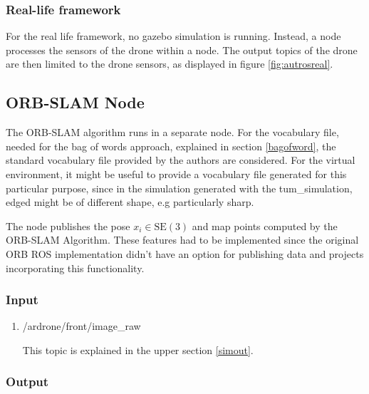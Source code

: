 	\subsubsection{Real-life framework}

	For the real life framework, no gazebo simulation is running. Instead, a node processes the sensors of the drone within a node. The output 
	topics of the drone are then limited to the drone sensors, as displayed in figure \ref{fig:autrosreal}.
	
	
	\subsection{ORB-SLAM Node}\label{orbnode}
	
	The ORB-SLAM algorithm runs in a separate node. For the vocabulary file, needed for the bag of words approach, explained in section \ref{bagofword}, the 
	standard vocabulary file provided by the authors are considered. For the virtual environment, it might be useful to provide a vocabulary file 
	generated for this particular purpose, since in the simulation generated with the tum\_simulation, edged might be of different shape, e.g particularly sharp. 
	
	The node publishes the pose $x_i \in \text{SE}(3)$ and map points computed by the ORB-SLAM Algorithm. These features had to be implemented since the original ORB ROS implementation didn’t have an option
	for publishing data and projects incorporating  this functionality.
	
	\subsubsection{Input}
	
	\begin{enumerate}
	\item{/ardrone/front/image\_raw}
	
	This topic is explained in the upper section \ref{simout}.
	
	\end{enumerate}
	
    \subsubsection{Output}
	
